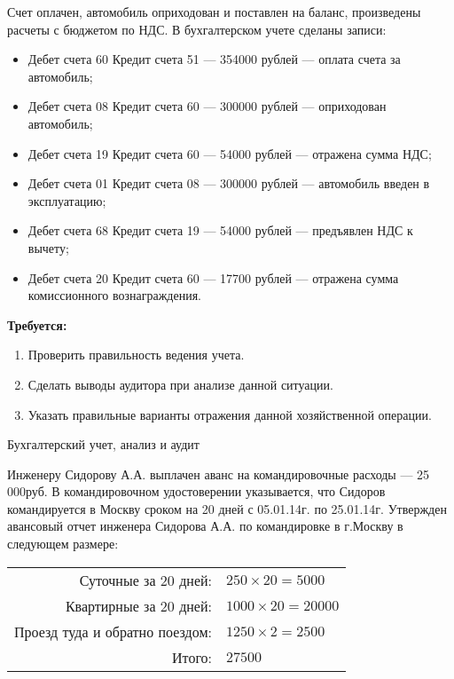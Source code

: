 \documentclass[
	11pt,
	a4paper,
	]
	{article}
\begin{document}
	Счет оплачен, автомобиль оприходован и поставлен на баланс, произведены расчеты с бюджетом по НДС. В бухгалтерском учете сделаны записи: 
	\begin{itemize}
		\item Дебет счета 60 Кредит счета 51 --- 354000 рублей --- оплата счета за автомобиль;
		\item Дебет счета 08 Кредит счета 60 --- 300000 рублей --- оприходован автомобиль;
		\item Дебет счета 19 Кредит счета 60 --- 54000 рублей --- отражена сумма НДС;
		\item Дебет счета 01 Кредит счета 08 --- 300000 рублей --- автомобиль введен в эксплуатацию;
		\item Дебет счета 68 Кредит счета 19 --- 54000 рублей --- предъявлен НДС к вычету;
		\item Дебет счета 20 Кредит счета 60 --- 17700 рублей --- отражена сумма комиссионного вознаграждения.
	\end{itemize}
	\textbf{Требуется:}
	\begin{enumerate}
		\item Проверить правильность ведения учета. 
		\item Сделать выводы аудитора при анализе данной ситуации.
		\item Указать правильные варианты отражения данной хозяйственной операции.
	\end{enumerate}

\begin{center}\lowGE * \end{center}
\newpage




 {Бухгалтерский учет, анализ и аудит}
\prGE

	Инженеру Сидорову А.А. выплачен аванс на командировочные расходы --- 25 000руб. В командировочном удостоверении указывается, что Сидоров командируется в Москву сроком на 20 дней с 05.01.14г. по 25.01.14г. Утвержден авансовый отчет инженера Сидорова А.А. по командировке в г.Москву в следующем размере:

	\begin{table}[ht!]\centering
	\begin{tabular}{rl}
		Суточные за 20 дней: 		& $250 \times 20 = 5000$ \\
		Квартирные за 20 дней:	& $1000 \times 20 = 20 000$ \\
		Проезд туда и обратно поездом: &  $1250 \times 2 = 2500$ \\\hline
		Итого: & $27 500$ 
	\end{tabular}
	\end{table}
\end{document}
